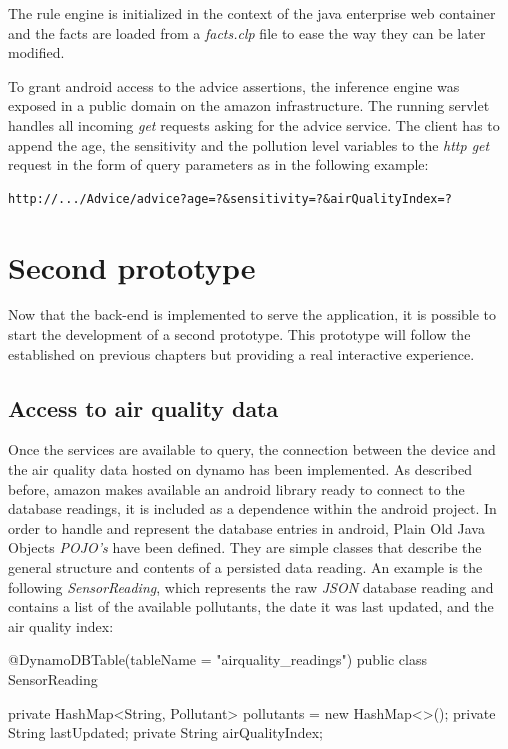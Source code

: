 The rule engine is initialized in the context of the java enterprise web container and the facts are loaded from a \textit{facts.clp} file to ease the way they can be later modified. 

To grant android access to the advice assertions, the inference engine was exposed in a public domain on the amazon infrastructure. The running servlet handles all incoming \textit{get} requests asking for the advice service. The client has to append the age, the sensitivity and the pollution level variables to the \textit{http get} request in the form of query parameters as in the following example: \bigskip


{\centering
\begin{BVerbatim}
http://.../Advice/advice?age=?&sensitivity=?&airQualityIndex=?
\end{BVerbatim}
\par
}

\section{Second prototype}
Now that the back-end is implemented to serve the application, it is possible to start the development of a second prototype. This prototype will follow the established on previous chapters but providing a real interactive experience.

\subsection{Access to air quality data}
Once the services are available to query, the connection between the device and the air quality data hosted on dynamo has been implemented. As described before, amazon makes available an android library ready to connect to the database readings, it is included as a dependence within the android project. In order to handle and represent the database entries in android, Plain Old Java Objects \textit{POJO's} have been defined. They  are simple classes that describe the general structure and contents of a persisted data reading. An example is the following \textit{SensorReading}, which represents the raw \textit{JSON} database reading  and contains a list of the available pollutants, the date it was last updated, and the air quality index:

{\centering
\begin{spverbatim}

@DynamoDBTable(tableName = "airquality_readings")
public class SensorReading {

    private HashMap<String, Pollutant> pollutants = new HashMap<>();
    private String lastUpdated;
    private String airQualityIndex;
}
\end{spverbatim}
\par
}

